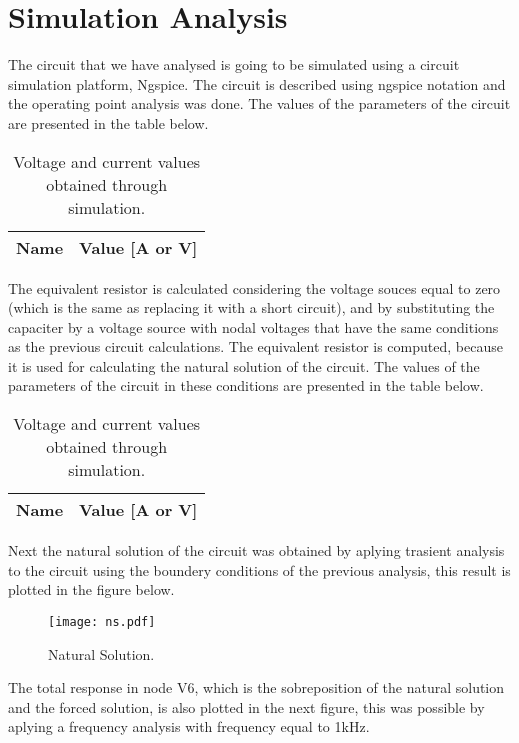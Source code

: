 \section{Simulation Analysis}
\label{sec:simulation}

The circuit that we have analysed is going to be simulated using a circuit simulation platform, Ngspice. The circuit is described using ngspice notation and the operating point analysis was done. The values of the parameters of the circuit are presented in the table below.

\begin{table}[ht]
  \centering
  \begin{tabular}{|l|r|}
    \hline    
    {\bf Name} & {\bf Value [A or V]} \\ \hline
    
  \end{tabular}
  \caption{Voltage and current values obtained through simulation.}
  \label{tab:op}
\end{table}


The equivalent resistor is calculated considering the voltage souces equal to zero (which is the same as replacing it with a short circuit), and by substituting the capaciter by a voltage source with nodal voltages that have the same conditions as the previous circuit calculations. The equivalent resistor is computed, because it is used for calculating the natural solution of the circuit. The values of the parameters of the circuit in these conditions are presented in the table below.

\begin{table}[ht]
  \centering
  \begin{tabular}{|l|r|}
    \hline    
    {\bf Name} & {\bf Value [A or V]} \\ \hline
    
  \end{tabular}
  \caption{Voltage and current values obtained through simulation.}
  \label{tab:op}
\end{table}

Next the natural solution of the circuit was obtained by aplying trasient analysis to the circuit using the boundery conditions of the previous analysis, this result is plotted in the figure below.

\begin{figure}[ht] \centering
\texttt{[image: ns.pdf]}
\caption{Natural Solution.}
\label{Fig1: ns}
\end{figure}

The total response in node V6, which is the sobreposition of the natural solution and the forced solution, is also plotted in the next figure, this was possible by aplying a frequency analysis with frequency equal to 1kHz.

